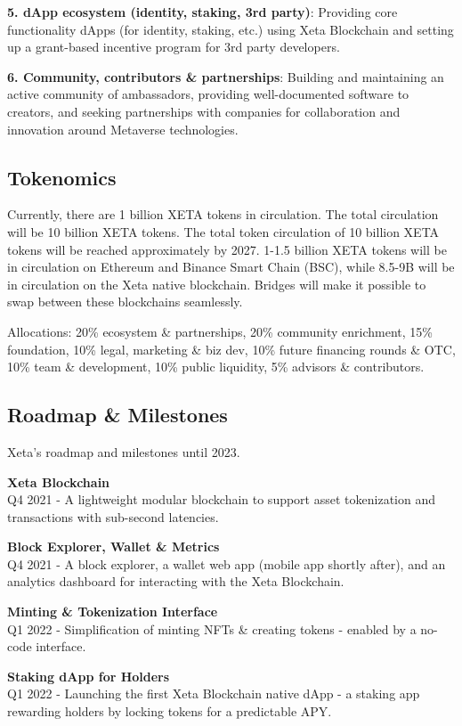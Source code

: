 \documentclass{article}
\begin{document}
\textbf{5. dApp ecosystem (identity, staking, 3rd party)}: Providing core functionality dApps (for identity, staking, etc.) using Xeta Blockchain and setting up a grant-based incentive program for 3rd party developers.
\bigskip

\textbf{6. Community, contributors \& partnerships}: Building and maintaining an active community of ambassadors, providing well-documented software to creators, and seeking partnerships with companies for collaboration and innovation around Metaverse technologies.

\subsection{Tokenomics}
Currently, there are 1 billion XETA tokens in circulation. The total circulation will be 10 billion XETA tokens. The total token circulation of 10 billion XETA tokens will be reached approximately by 2027. 1-1.5 billion XETA tokens will be in circulation on Ethereum and Binance Smart Chain (BSC), while 8.5-9B will be in circulation on the Xeta native blockchain. Bridges will make it possible to swap between these blockchains seamlessly.
\bigskip

Allocations: 20\% ecosystem \& partnerships, 20\% community enrichment, 15\% foundation, 10\% legal, marketing \& biz dev, 10\% future financing rounds \& OTC, 10\% team \& development, 10\% public liquidity, 5\% advisors \& contributors.

\subsection{Roadmap \& Milestones}
Xeta's roadmap and milestones until 2023.
\bigskip

\textbf{Xeta Blockchain}\\
Q4 2021 - A lightweight modular blockchain to support asset tokenization and transactions with sub-second latencies.
\bigskip

\textbf{Block Explorer, Wallet \& Metrics}\\
Q4 2021 - A block explorer, a wallet web app (mobile app shortly after), and an analytics dashboard for interacting with the Xeta Blockchain.
\bigskip

\textbf{Minting \& Tokenization Interface}\\
Q1 2022 - Simplification of minting NFTs \& creating tokens - enabled by a no-code interface.
\bigskip

\textbf{Staking dApp for Holders}\\
Q1 2022 - Launching the first Xeta Blockchain native dApp - a staking app rewarding holders by locking tokens for a predictable APY.
\bigskip
\end{document}

